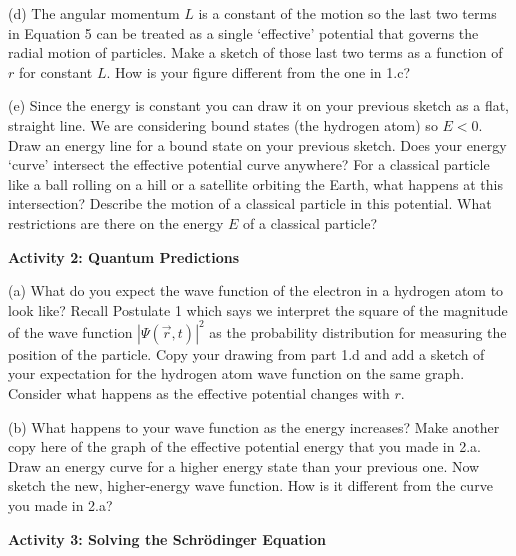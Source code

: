 (d) The angular momentum $L$ is a constant of the motion so the last two terms in 
Equation 5 can be treated as a single `effective' potential that governs the radial motion
of particles.
Make a sketch of those last two terms as a function of $r$ for constant $L$.
How is your figure different from the one in 1.c?
\vskip 3.0cm

\newpage

(e) Since the energy is constant you can draw it on your previous sketch as a flat, straight
line. We are considering bound states (the hydrogen atom) so $E < 0$.
Draw an energy line for a bound state on your previous sketch.
Does your energy `curve' intersect the effective potential curve anywhere?
For a classical particle like a ball rolling on a hill or a satellite orbiting the
Earth,
what happens at this intersection?
Describe the motion of a classical particle in this potential.
What restrictions are there on the energy $E$ of a classical particle?
\vskip 3.0cm

\textbf{Activity 2: Quantum Predictions}

(a) What do you expect the wave function of the electron in a hydrogen atom to look like?
Recall Postulate 1 which says we interpret the square of the magnitude of the wave function
$|\Psi(\vec r, t)|^2$ as the probability distribution for measuring the position of the 
particle.
Copy your drawing from part 1.d and add
a sketch of your expectation for the hydrogen atom wave function on the same graph. 
Consider what happens
as the effective potential changes with $r$.
\vskip 4.0cm

(b) What happens to your wave function as the energy increases?
Make another copy here of the graph of the effective potential energy that you made in 2.a.
Draw an energy curve for a higher energy state than your previous one.
Now sketch the new, higher-energy wave function.
How is it different from the curve you made in 2.a?
\vskip 4.0cm

\textbf{Activity 3: Solving the Schr\"odinger Equation}

